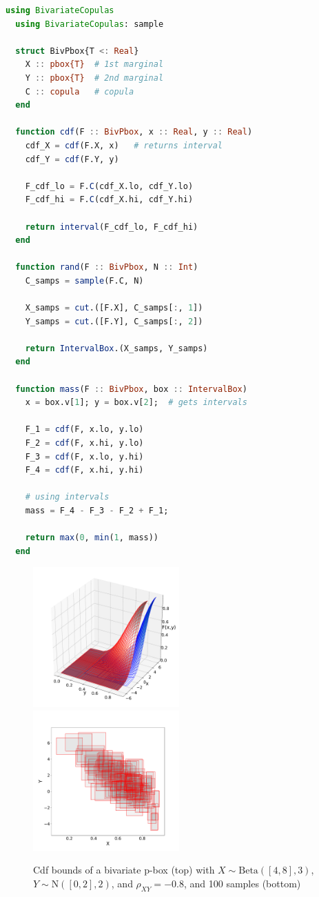 \documentclass{juliacon}
\begin{document}
\begin{lstlisting}[language = Julia]
  using BivariateCopulas
  using BivariateCopulas: sample

  struct BivPbox{T <: Real}
    X :: pbox{T}  # 1st marginal
    Y :: pbox{T}  # 2nd marginal
    C :: copula   # copula
  end

  function cdf(F :: BivPbox, x :: Real, y :: Real)
    cdf_X = cdf(F.X, x)   # returns interval
    cdf_Y = cdf(F.Y, y)

    F_cdf_lo = F.C(cdf_X.lo, cdf_Y.lo)
    F_cdf_hi = F.C(cdf_X.hi, cdf_Y.hi)

    return interval(F_cdf_lo, F_cdf_hi)
  end

  function rand(F :: BivPbox, N :: Int)
    C_samps = sample(F.C, N)

    X_samps = cut.([F.X], C_samps[:, 1])
    Y_samps = cut.([F.Y], C_samps[:, 2])

    return IntervalBox.(X_samps, Y_samps)
  end

  function mass(F :: BivPbox, box :: IntervalBox)
    x = box.v[1]; y = box.v[2];  # gets intervals

    F_1 = cdf(F, x.lo, y.lo)
    F_2 = cdf(F, x.hi, y.lo)
    F_3 = cdf(F, x.lo, y.hi)
    F_4 = cdf(F, x.hi, y.hi)

    # using intervals
    mass = F_4 - F_3 - F_2 + F_1;

    return max(0, min(1, mass))
  end
\end{lstlisting}
\begin{figure}[htp]
  \includegraphics[width=0.5\textwidth]{../examples/JuliaCon/fig7/biv_cdf.pdf} 
  \includegraphics[width=0.5\textwidth]{../examples/JuliaCon/fig7/samples.pdf}
  \caption{Cdf bounds of a bivariate p-box (top) with $X \sim \text{Beta}([4,8], 3)$, $Y \sim \text{N}([0,2], 2)$, and $\rho_{XY} = -0.8$, and 100 samples (bottom)}
  \label{fig:figure7}
\end{figure}
\end{document}
